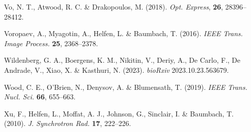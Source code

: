 \documentclass{article}
\begin{document}
\begin{hangpars}
Vo, N. T., Atwood, R. C. \& Drakopoulos, M. (2018). \emph{Opt. Express}, \textbf{26}, 28396–28412.

Voropaev, A., Myagotin, A., Helfen, L. \& Baumbach, T. (2016). \emph{IEEE Trans. Image Process.} \textbf{25}, 2368–2378.

Wildenberg, G. A., Boergens, K. M., Nikitin, V., Deriy, A., De Carlo, F., De Andrade, V., Xiao, X. \& Kasthuri, N. (2023). \emph{bioRxiv} 2023.10.23.563679.

Wood, C. E., O’Brien, N., Denysov, A. \& Blumensath, T. (2019). \emph{IEEE Trans. Nucl. Sci.} \textbf{66}, 655–663.

Xu, F., Helfen, L., Moffat, A. J., Johnson, G., Sinclair, I. \& Baumbach, T. (2010). \emph{J. Synchrotron Rad.} \textbf{17}, 222–226.

\end{hangpars}
\end{document}
